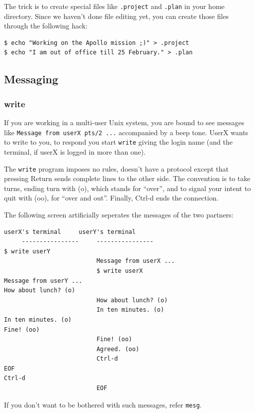 \documentclass[11pt,a4paper,twoside]{article}
\begin{document}
The trick is to create special files like \texttt{.project} and \texttt{.plan} 
in your home directory. Since we haven't done file editing yet, you can create 
those files through the following hack:

\begin{lstlisting}[frame=single]
$ echo "Working on the Apollo mission ;)" > .project
$ echo "I am out of office till 25 February." > .plan
\end{lstlisting}


\subsection{Messaging}

\subsubsection{write}
If you are working in a multi-user Unix system, you are bound to see messages 
like \texttt{Message from userX pts/2  ...} accompanied by a beep tone. UserX
wants to write to you, to respond you start \texttt{write} giving the login 
name (and the terminal, if userX is logged in more than one).

The \texttt{write} program imposes no rules, doesn't have a protocol  
except that pressing Return sends complete lines to the other side.
The convention is to take turns, ending turn with (o), which stands
for ``over'', and to signal your intent to quit with (oo), for 
``over and out''. Finally, Ctrl-d ends the connection.

The following screen artificially seperates the messages of the
two partners:

\begin{lstlisting}[frame=single]
     userX's terminal     userY's terminal
     ----------------     ----------------
$ write userY
                          Message from userX ...
                          $ write userX
Message from userY ...
How about lunch? (o)
                          How about lunch? (o)
                          In ten minutes. (o)
In ten minutes. (o)
Fine! (oo)
                          Fine! (oo)
                          Agreed. (oo)
                          Ctrl-d
EOF
Ctrl-d
                          EOF
\end{lstlisting}

If you don't want to be bothered with such messages, refer \texttt{mesg}.
\end{document}

